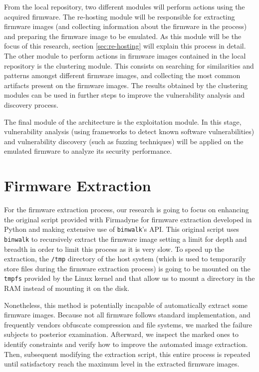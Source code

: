 From the local repository, two different modules will perform actions using the acquired firmware. The re-hosting module will be responsible for extracting firmware images (and collecting information about the firmware in the process) and preparing the firmware image to be emulated. As this module will be the focus of this research, section \ref{sec:re-hosting} will explain this process in detail. The other module to perform actions in firmware images contained in the local repository is the clustering module. This consists on searching for similarities and patterns amongst different firmware images, and collecting the most common artifacts present on the firmware images. The results obtained by the clustering modules can be used in further steps to improve the vulnerability analysis and discovery process.

The final module of the architecture is the exploitation module. In this stage, vulnerability analysis (using frameworks to detect known software vulnerabilities) and vulnerability discovery (such as fuzzing techniques) will be applied on the emulated firmware to analyze its security performance.

\section{Firmware Extraction}
\label{sec:extraction}

For the firmware extraction process, our research is going to focus on enhancing the original script provided with Firmadyne \cite{firmadyne} for firmware extraction developed in Python and making extensive use of {\tt binwalk}'s API. This original script uses {\tt binwalk} to recursively extract the firmware image setting a limit for depth and breadth in order to limit this process as it is very slow. To speed up the extraction, the {\tt /tmp} directory of the host system (which is used to temporarily store files during the firmware extraction process) is going to be mounted on the {\tt tmpfs} provided by the Linux kernel and that allow us to mount a directory in the RAM instead of mounting it on the disk.

Nonetheless, this method is potentially incapable of automatically extract some firmware images. Because not all firmware follows standard implementation, and frequently vendors obfuscate compression and file systems, we marked the failure subjects to posterior examination. Afterward, we inspect the marked ones to identify constraints and verify how to improve the automated image extraction. Then, subsequent modifying the extraction script, this entire process is repeated until satisfactory reach the maximum level in the extracted firmware images.

